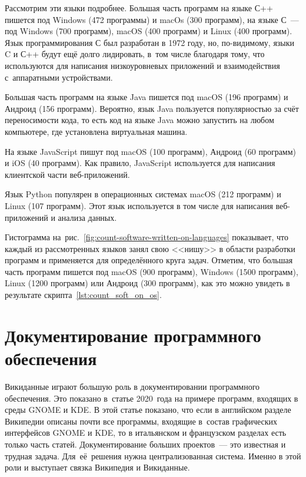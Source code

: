 Рассмотрим эти языки подробнее. 
Большая часть программ на языке С++ пишется под Windows (472 программы) и macOs (300 программ), 
на языке С~--- под Windows (700 программ), macOS (400 программ) и Linux (400 программ). 
Язык программирования С был разработан в 1972 году, 
но, по-видимому, языки C и С++ будут ещё долго лидировать, 
в~том числе благодаря тому, что используются для написания низкоуровневых приложений 
и взаимодействия с~аппаратными устройствами\autocite{FutureProgrLang2016}.

Большая часть программ на языке Java пишется под macOS (196 программ) и Андроид (156 программ). 
Вероятно, язык Java пользуется популярностью 
за счёт переносимости кода, 
то есть код на языке Java можно запустить на любом компьютере, 
где установлена виртуальная машина. 

На языке JavaScript пишут под macOS (100 программ), 
Андроид (60 программ) и iOS (40 программ). Как правило, 
JavaScript используется для написания клиентской части веб-приложений.

Язык Python популярен в операционных системах macOS (212 программ) и Linux (107 программ). 
Этот язык используется в том числе для написания веб-приложений и анализа данных.

Гистограмма на~рис.~\ref{fig:count-software-written-on-languages} показывает, 
что каждый из рассмотренных языков занял свою <<нишу>> в области разработки программ 
и применяется для определённого круга задач. 
Отметим, что большая часть программ пишется под macOS (900 программ), Windows (1500 программ), Linux (1200 программ) или Андроид (300 программ), как это можно увидеть в результате скрипта~\ref{lst:count_soft_on_os}.



\section{Документирование программного обеспечения}
Викиданные играют большую роль в документировании программного обеспечения. 
Это показано в~статье 2020~года\autocite{Samuel2020DocumentingWiki} на примере программ, входящих в среды GNOME и KDE. 
В этой статье показано, что если в английском разделе Википедии описаны почти все программы, 
входящие в~состав графических интерфейсов GNOME и KDE, 
то в итальянском и французском разделах есть только часть статей. 
Документирование больших проектов~--- это известная и трудная задача. 
Для~её~решения нужна централизованная система. 
Именно в этой роли и выступает связка Википедия и Викиданные\autocite{Samuel2020DocumentingWiki}.

